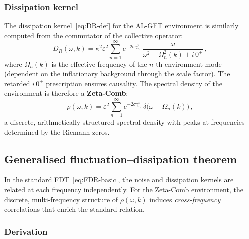 \documentclass[12pt,a4paper]{article}
\begin{document}
\subsubsection{Dissipation kernel}\label{sssec:dissipation-kernel}

The dissipation kernel~\eqref{eq:DR-def} for the AL-GFT environment
is similarly computed from the commutator of the collective operator:
\begin{equation}\label{eq:DR-ALGFT}
  D_{R}(\omega,k)
  = \kappa^{2}\varepsilon^{2}\sum_{n=1}^{\infty}
    e^{-2\sigma\gamma_{n}^{2}}\;
    \frac{\omega}{\omega^{2}-\Omega_{n}^{2}(k)+i\,0^{+}}\,,
\end{equation}
where $\Omega_{n}(k)$ is the effective frequency of the $n$-th
environment mode (dependent on the inflationary background through the
scale factor).  The retarded $i\,0^{+}$ prescription ensures
causality.  The spectral density of the environment is therefore a
\textbf{Zeta-Comb}:
\begin{equation}\label{eq:rho-zeta}
  \rho(\omega,k)
  = \varepsilon^{2}\sum_{n=1}^{\infty}
    e^{-2\sigma\gamma_{n}^{2}}\;
    \delta\bigl(\omega-\Omega_{n}(k)\bigr)\,,
\end{equation}
a discrete, arithmetically-structured spectral density with peaks at
frequencies determined by the Riemann zeros.

\subsection{Generalised fluctuation--dissipation theorem}%
\label{ssec:gen-FDT}

In the standard FDT~\eqref{eq:FDR-basic}, the noise and dissipation
kernels are related at each frequency independently.  For the
Zeta-Comb environment, the discrete, multi-frequency structure of
$\rho(\omega,k)$ induces \emph{cross-frequency} correlations that
enrich the standard relation.

\subsubsection{Derivation}\label{sssec:FDT-derivation}
\end{document}
